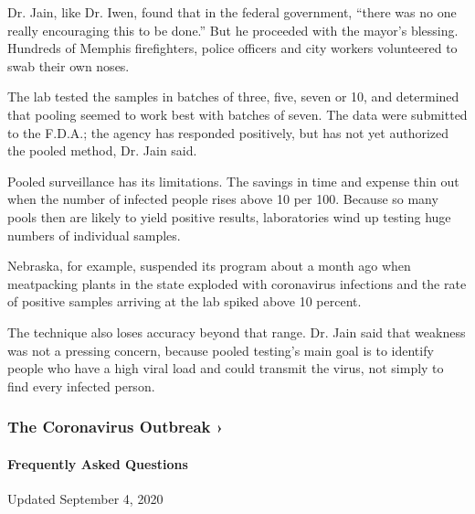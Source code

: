 Dr. Jain, like Dr. Iwen, found that in the federal government, ``there
was no one really encouraging this to be done.'' But he proceeded with
the mayor's blessing. Hundreds of Memphis firefighters, police officers
and city workers volunteered to swab their own noses.

The lab tested the samples in batches of three, five, seven or 10, and
determined that pooling seemed to work best with batches of seven. The
data were submitted to the F.D.A.; the agency has responded positively,
but has not yet authorized the pooled method, Dr. Jain said.

Pooled surveillance has its limitations. The savings in time and expense
thin out when the number of infected people rises above 10 per 100.
Because so many pools then are likely to yield positive results,
laboratories wind up testing huge numbers of individual samples.

Nebraska, for example, suspended its program about a month ago when
meatpacking plants in the state exploded with coronavirus infections and
the rate of positive samples arriving at the lab spiked above 10
percent.

The technique also loses accuracy beyond that range. Dr. Jain said that
weakness was not a pressing concern, because pooled testing's main goal
is to identify people who have a high viral load and could transmit the
virus, not simply to find every infected person.

\href{https://www.nytimes3xbfgragh.onion/news-event/coronavirus?action=click\&pgtype=Article\&state=default\&region=MAIN_CONTENT_3\&context=storylines_faq}{}

\hypertarget{the-coronavirus-outbreak-}{%
\subsubsection{The Coronavirus Outbreak
›}\label{the-coronavirus-outbreak-}}

\hypertarget{frequently-asked-questions}{%
\paragraph{Frequently Asked
Questions}\label{frequently-asked-questions}}

Updated September 4, 2020

